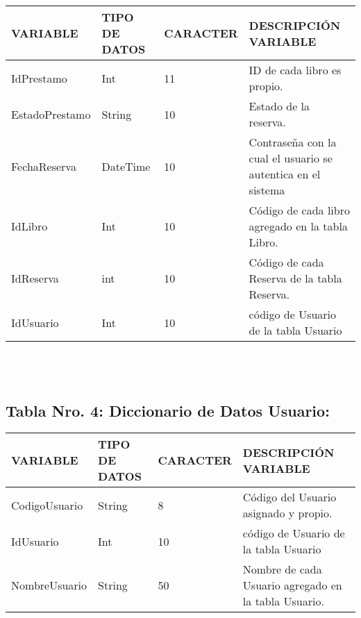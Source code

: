 \documentclass{article}
\begin{document}
\begin{tabular}{|p{25mm}|l|p{20mm}|p{50mm}|}\hline
 
VARIABLE  & TIPO DE DATOS  & CARACTER & DESCRIPCIÓN VARIABLE\\\hline
IdPrestamo & Int & 11 & ID de cada libro es propio.\\\hline
EstadoPrestamo & String & 10 & Estado de la reserva.\\\hline
FechaReserva & DateTime  & 10 & Contraseña con la cual el usuario se autentica en el sistema\\\hline
IdLibro & Int & 10 & Código de cada libro agregado en la tabla Libro.\\\hline
IdReserva & int & 10 & Código de cada Reserva de la tabla Reserva.\\\hline
IdUsuario & Int & 10 & código de Usuario de la tabla Usuario\\\hline
\end{tabular}
\\
\\
\subsection{Tabla Nro. 4: Diccionario de Datos Usuario:}

\begin{tabular}{|p{25mm}|l|p{20mm}|p{50mm}|}\hline
 
VARIABLE  & TIPO DE DATOS  & CARACTER & DESCRIPCIÓN VARIABLE\\\hline
CodigoUsuario & String & 8 & Código del Usuario asignado y propio. \\\hline
IdUsuario & Int & 10 & código de Usuario de la tabla Usuario\\\hline
NombreUsuario & String & 50 & Nombre de cada Usuario agregado en la tabla Usuario.\\\hline
\end{tabular}
\end{document}
